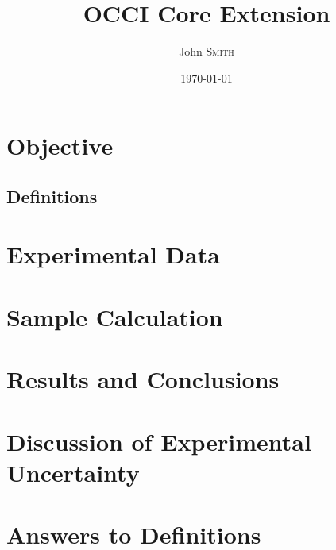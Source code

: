 \documentclass{article}
\title{OCCI Core Extension} %
\author{John \textsc{Smith}} %
\date{\today} %
\begin{document}
\maketitle %
\newpage
\section{Objective}
\subsection{Definitions}
\label{definitions} 
\section{Experimental Data}
\section{Sample Calculation}
\section{Results and Conclusions}
\section{Discussion of Experimental Uncertainty}
\section{Answers to Definitions}
\end{document}
